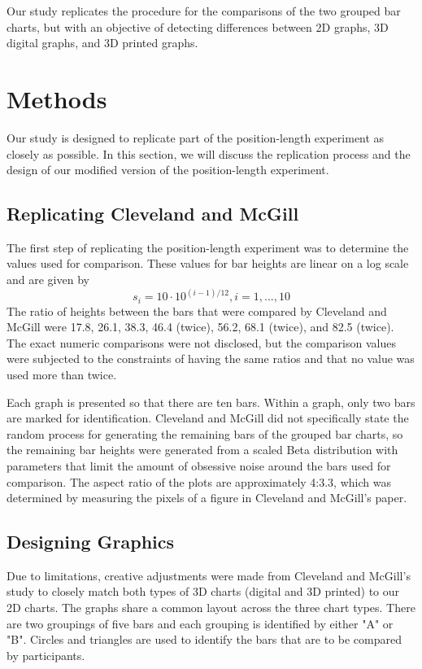 \documentclass[10pt]{article}
\begin{document}
Our study replicates the procedure for the comparisons of the two grouped bar charts, but with an objective of detecting differences between 2D graphs, 3D digital graphs, and 3D printed graphs.

\section{Methods}

Our study is designed to replicate part of the position-length experiment as closely as possible. In this section, we will discuss the replication process and the design of our modified version of the position-length experiment.

\subsection{Replicating Cleveland and McGill}

The first step of replicating the position-length experiment was to determine the values used for comparison. These values for bar heights are linear on a log scale and are given by 
$$s_i=10\cdot 10^{(i-1)/12}, i=1,...,10$$
The ratio of heights between the bars that were compared by Cleveland and McGill were 17.8, 26.1, 38.3, 46.4 (twice), 56.2, 68.1 (twice), and 82.5 (twice). 
The exact numeric comparisons were not disclosed, but the comparison values were subjected to the constraints of having the same ratios and that no value was used more than twice.

Each graph is presented so that there are ten bars. 
Within a graph, only two bars are marked for identification.
Cleveland and McGill did not specifically state the random process for generating the remaining bars of the grouped bar charts, so the remaining bar heights were generated from a scaled Beta distribution with parameters that limit the amount of obsessive noise around the bars used for comparison. The aspect ratio of the plots are approximately 4:3.3, which was determined by measuring the pixels of a figure in Cleveland and McGill's paper. 

\subsection{Designing Graphics}

Due to limitations, creative adjustments were made from Cleveland and McGill's study to closely match both types of 3D charts (digital and 3D printed) to our 2D charts. 
The graphs share a common layout across the three chart types. 
There are two groupings of five bars and each grouping is identified by either "A" or "B". Circles and triangles are used to identify the bars that are to be compared by participants.
\end{document}
